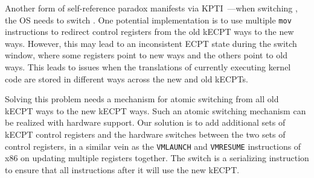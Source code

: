 
\label{emt:sec:split_kecpt}
Another form of self-reference paradox manifests
	via KPTI~\cite{linux:kpti}---when switching 
	,
	the OS needs to switch 
	. 
One potential implementation is to use multiple \texttt{\small mov} instructions to redirect control registers 
		from the old kECPT ways to the new ways.
However, this may lead to an inconsistent ECPT state during the switch window, 
	where some registers point to new ways and the others point to old ways.
This leads to issues 
	when the translations of currently executing kernel code 
	are stored in different ways across the new and old kECPTs.

Solving this problem needs a mechanism for atomic switching from all 
	old kECPT ways to the new kECPT ways.
Such an atomic switching mechanism can be realized with hardware support. 
Our solution is to add additional sets of kECPT control registers 
	and the hardware switches between the two sets of control registers,
	in a similar vein as the \texttt{VMLAUNCH} and \texttt{VMRESUME} instructions of x86
	on updating multiple registers together.
The switch is a serializing instruction to ensure 
that all instructions after it will use the new kECPT.

